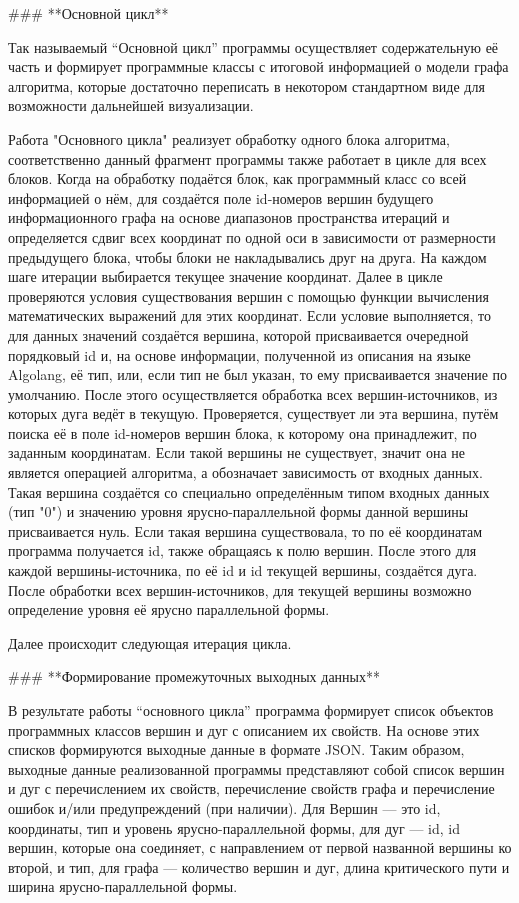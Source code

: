 ### **Основной цикл**

Так называемый “Основной цикл” программы осуществляет содержательную её часть и формирует программные классы с итоговой информацией о модели графа алгоритма, которые достаточно переписать в некотором стандартном виде для возможности дальнейшей визуализации.

Работа "Основного цикла" реализует обработку одного блока алгоритма, соответственно данный фрагмент программы также работает в цикле для всех блоков. Когда на обработку подаётся блок, как программный класс со всей информацией о нём, для создаётся поле id-номеров вершин будущего информационного графа на основе диапазонов пространства итераций и определяется сдвиг всех координат по одной оси в зависимости от размерности предыдущего блока, чтобы блоки не накладывались друг на друга. На каждом шаге итерации выбирается текущее значение координат. Далее в цикле проверяются условия существования вершин с помощью функции вычисления математических выражений для этих координат. Если условие выполняется, то для данных значений создаётся вершина, которой присваивается очередной порядковый id и, на основе информации, полученной из описания на языке Algolang, её тип, или, если тип не был указан, то ему присваивается значение по умолчанию. После этого осуществляется обработка всех вершин-источников, из которых дуга ведёт в текущую. Проверяется, существует ли эта вершина, путём поиска её в поле id-номеров вершин блока, к которому она принадлежит, по заданным координатам. Если такой вершины не существует, значит она не является операцией алгоритма, а обозначает зависимость от входных данных. Такая вершина создаётся со специально определённым типом входных данных (тип "0") и значению уровня ярусно-параллельной формы данной вершины присваивается нуль. Если такая вершина существовала, то по её координатам программа получается id, также обращаясь к полю вершин. После этого для каждой вершины-источника, по её id и id текущей вершины, создаётся дуга. После обработки всех вершин-источников, для текущей вершины возможно определение уровня её ярусно параллельной формы. 

Далее происходит следующая итерация цикла.

### **Формирование промежуточных выходных данных**

В результате работы “основного цикла” программа формирует список объектов программных классов вершин и дуг с описанием их свойств. На основе этих списков формируются выходные данные в формате JSON. Таким образом, выходные данные реализованной программы представляют собой список вершин и дуг с перечислением их свойств, перечисление свойств графа и перечисление ошибок и/или предупреждений (при наличии). Для Вершин — это id, координаты, тип и уровень ярусно-параллельной формы, для дуг — id, id вершин, которые она соединяет, с направлением от первой названной вершины ко второй, и тип, для графа — количество вершин и дуг, длина критического пути и ширина ярусно-параллельной формы.

